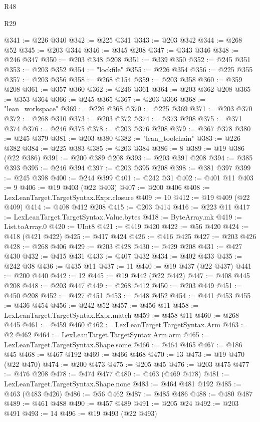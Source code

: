 \begin{lexlean}{R48}
\begin{lexlean}{R29}
\begin{coremodule}
{{{{{{{{{{{{{{{{{{{{{{{{{{{{{{{{{{{{{{{{{{{{{{{{{{{{{{{{{{{{{{{{{{{{{{{{{{{{{{{{{{{{{{{{{{{{{{{{{{{{{{{{{{{{{{{{{{{{{{{{{{{{{{{{{{{{{{{{{{{{{{{{{{{{{{{{{{{{{{{{{{{{{{{{{{{{{{{{{{{{{{{{{{{{{{{{{{{{{{{{{{{{{{{{{{{{{{{{{{@341 := @226 @340
@342 := @225 @341
@343 := @203 @342
@344 := @268 @52
@345 := @203 @344
@346 := @345 @208
@347 := @343 @346
@348 := @246 @347
@350 := @203 @348 @208
@351 := @339 @350
@352 := @245 @351
@353 := @203 @352
@354 := "lockfile"
@355 := @226 @354
@356 := @225 @355
@357 := @203 @356
@358 := @268 @154
@359 := @203 @358
@360 := @359 @208
@361 := @357 @360
@362 := @246 @361
@364 := @203 @362 @208
@365 := @353 @364
@366 := @245 @365
@367 := @203 @366
@368 := "lean_workspace"
@369 := @226 @368
@370 := @225 @369
@371 := @203 @370
@372 := @268 @310
@373 := @203 @372
@374 := @373 @208
@375 := @371 @374
@376 := @246 @375
@378 := @203 @376 @208
@379 := @367 @378
@380 := @245 @379
@381 := @203 @380
@382 := "lean_toolchain"
@383 := @226 @382
@384 := @225 @383
@385 := @203 @384
@386 := 8
@389 := @19 @386 (@22 @386)
@391 := @200 @389 @208
@393 := @203 @391 @208
@394 := @385 @393
@395 := @246 @394
@397 := @203 @395 @208
@398 := @381 @397
@399 := @245 @398
@400 := @244 @399
@401 := @242 @31
@402 := @401 @11
@403 := 9
@406 := @19 @403 (@22 @403)
@407 := @200 @406
@408 := LexLeanTarget.TargetSyntax.Expr.closure
@409 := 10
@412 := @19 @409 (@22 @409)
@414 := @408 @412 @208
@415 := @203 @414
@416 := @223 @11
@417 := LexLeanTarget.TargetSyntax.Value.bytes
@418 := ByteArray.mk
@419 := List.toArray.{0}
@420 := UInt8
@421 := @419 @420
@422 := @56 @420
@424 := @418 (@421 @422)
@425 := @417 @424
@426 := @416 @425
@427 := @203 @426
@428 := @268 @406
@429 := @203 @428
@430 := @429 @208
@431 := @427 @430
@432 := @415 @431
@433 := @407 @432
@434 := @402 @433
@435 := @242 @38
@436 := @435 @11
@437 := 11
@440 := @19 @437 (@22 @437)
@441 := @200 @440
@442 := 12
@445 := @19 @442 (@22 @442)
@447 := @408 @445 @208
@448 := @203 @447
@449 := @268 @412
@450 := @203 @449
@451 := @450 @208
@452 := @427 @451
@453 := @448 @452
@454 := @441 @453
@455 := @436 @454
@456 := @242 @52
@457 := @456 @11
@458 := LexLeanTarget.TargetSyntax.Expr.match
@459 := @458 @11
@460 := @268 @445
@461 := @459 @460
@462 := LexLeanTarget.TargetSyntax.Arm
@463 := @2 @462
@464 := LexLeanTarget.TargetSyntax.Arm.arm
@465 := LexLeanTarget.TargetSyntax.Shape.some
@466 := @464 @465
@467 := @186 @45
@468 := @467 @192
@469 := @466 @468
@470 := 13
@473 := @19 @470 (@22 @470)
@474 := @200 @473
@475 := @205 @45
@476 := @203 @475
@477 := @476 @208
@478 := @474 @477
@480 := @463 (@469 @478)
@481 := LexLeanTarget.TargetSyntax.Shape.none
@483 := @464 @481 @192
@485 := @463 (@483 @426)
@486 := @56 @462
@487 := @485 @486
@488 := @480 @487
@489 := @461 @488
@490 := @457 @489
@491 := @205 @24
@492 := @203 @491
@493 := 14
@496 := @19 @493 (@22 @493)
}}}}}}}}}}}}}}}}}}}}}}}}}}}}}}}}}}}}}}}}}}}}}}}}}}}}}}}}}}}}}}}}}}}}}}}}}}}}}}}}}}}}}}}}}}}}}}}}}}}}}}}}}}}}}}}}}}}}}}}}}}}}}}}}}}}}}}}}}}}}}}}}}}}}}}}}}}}}}}}}}}}}}}}}}}}}}}}}}}}}}}}}}}}}}}}}}}}}}}}}}}}}}}}}}}}}}}}}}}
\end{coremodule}
\end{lexlean}
\end{lexlean}
